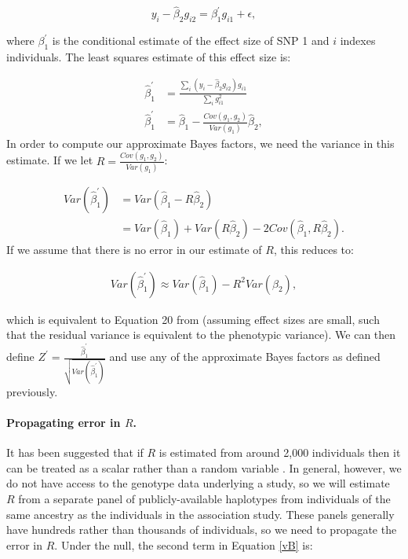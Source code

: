 \documentclass[11pt,titlepage]{article}
\begin{document}
\begin{equation}
y_i - \hat \beta_2 g_{i2} =  \beta_1^{\prime} g_{i1} + \epsilon,
\end{equation}

\noindent where  $\beta_1^{\prime}$ is the conditional estimate of the effect size of SNP 1 and $i$ indexes individuals. The least squares estimate of this effect size is:

\begin{align}
\hat \beta_1^{\prime} &= \frac{\sum \limits_i (y_i - \hat \beta_2 g_{i2})  g_{i1}}{ \sum \limits_i g_{i1}^2} \\
\hat \beta_1^{\prime} &= \hat \beta_1 - \frac{Cov(g_1, g_2)}{Var(g_1)} \hat \beta_2,
\end{align}
\noindent In order to compute our approximate Bayes factors, we need the variance in this estimate. If we let $R = \frac{Cov(g_1, g_2)}{Var(g_1)}$:

\begin{align}
Var(\hat \beta_1^{\prime}) &= Var( \hat \beta_1 - R \hat \beta_2)\\
&= Var(\hat \beta_1) + Var(R \hat \beta_2) - 2 Cov (\hat \beta_1, R \hat \beta_2) \label{vB}.
\end{align}
If we assume that there is no error in our estimate of $R$, this reduces to:

\begin{align}
Var(\hat \beta_1^{\prime}) \approx Var(\hat \beta_1) - R^2 Var( \hat \beta_2),
\end{align}

\noindent which is equivalent to Equation 20 from \citet{Yang:2012uq} (assuming effect sizes are small, such that the residual variance is equivalent to the phenotypic variance). We can then define $Z^{\prime} = \frac{\hat \beta_1^{\prime}}{\sqrt{ Var(\hat \beta_1^{\prime})}}$ and use any of the approximate Bayes factors as defined previously. 

\paragraph{Propagating error in $R$.} It has been suggested that if $R$ is estimated from around 2,000 individuals then it can be treated as a scalar rather than a random variable \citep{Yang:2012uq}. In general, however, we do not have access to the genotype data underlying a study, so we will estimate $R$ from a separate panel of publicly-available haplotypes from individuals of the same ancestry as the individuals in the association study. These panels generally have hundreds rather than thousands of individuals, so we need to propagate the error in $R$. Under the null, the second term in Equation \ref{vB} is:
\end{document}
